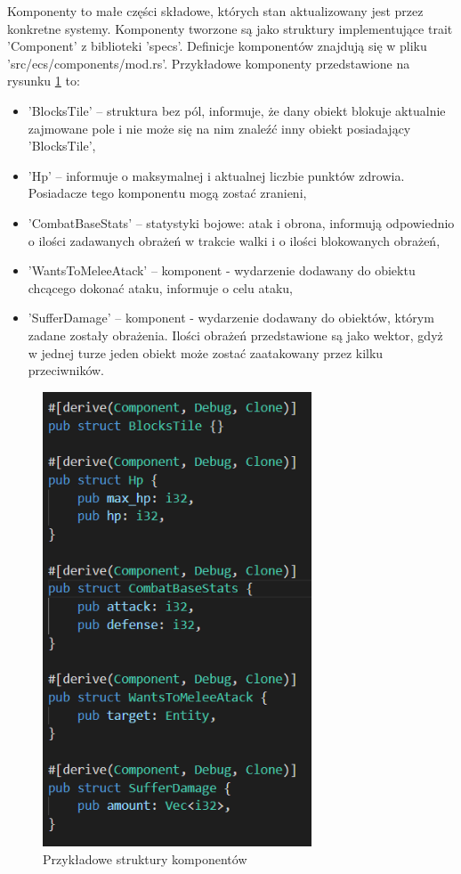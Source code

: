 \documentclass[12pt,twoside]{article}
\begin{document}
Komponenty to małe części składowe, których stan aktualizowany jest przez konkretne systemy. Komponenty tworzone są jako struktury implementujące trait 'Component' z biblioteki 'specs'. Definicje komponentów znajdują się w pliku 'src/ecs/components/mod.rs'. Przykładowe komponenty przedstawione na rysunku \ref{code:comps} to:
\begin{itemize}	
	\item 'BlocksTile' -- struktura bez pól, informuje, że dany obiekt blokuje aktualnie zajmowane pole i nie może się na nim znaleźć inny obiekt posiadający 'BlocksTile',
	\item 'Hp' -- informuje o maksymalnej i aktualnej liczbie punktów zdrowia. Posiadacze tego komponentu mogą zostać zranieni,
	\item 'CombatBaseStats' -- statystyki bojowe: atak i obrona, informują odpowiednio o ilości zadawanych obrażeń w trakcie walki i o ilości blokowanych obrażeń,
	\item 'WantsToMeleeAtack' -- komponent - wydarzenie dodawany do obiektu chcącego dokonać ataku, informuje o celu ataku,
	\item 'SufferDamage' -- komponent - wydarzenie dodawany do obiektów, którym zadane zostały obrażenia. Ilości obrażeń przedstawione są jako wektor, gdyż w jednej turze jeden obiekt może zostać zaatakowany przez kilku przeciwników.
\end{itemize}
	
\FloatBarrier
\begin{figure}[h]
	\centering
	\includegraphics[width=8cm]{images/code/comps.png}
	\caption{Przykładowe struktury komponentów}
	\label{code:comps}
\end{figure}
\FloatBarrier
\end{document}
